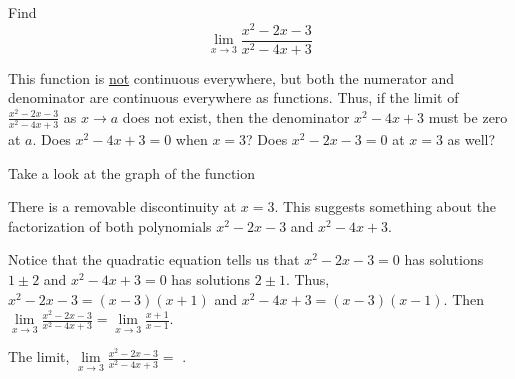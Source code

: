 \documentclass{ximera}
\begin{document}
\begin{question}
  Find 
  \[
  \displaystyle \lim_{x\to3} \frac{x^2-2x-3}{x^2-4x+3}
  \]
  \begin{solution}
    \begin{hint}
      This function is \underline{not} continuous everywhere, but both the numerator and denominator are continuous everywhere as functions. Thus, if the limit of $\frac{x^2-2x-3}{x^2-4x+3}$ as $x\to{a}$ does not exist, then the denominator $x^2-4x+3$ must be zero at $a$. Does $x^2-4x+3=0$ when $x=3$? Does $x^2-2x-3=0$ at $x=3$ as well?
    \end{hint}
     \begin{hint}
    Take a look at the graph of the function
    \begin{center}
      \end{center}
      There is a removable discontinuity at $x=3$. This suggests something about the factorization of both polynomials $x^2-2x-3$ and $x^2-4x+3$.
    \end{hint}
    \begin{hint}
     Notice that the quadratic equation tells us that $x^2-2x-3=0$ has solutions $1\pm2$ and $x^2-4x+3=0$ has solutions $2\pm{1}$. Thus, $x^2-2x-3=\left(x-3\right)\left(x+1\right)$ and $x^2-4x+3=\left(x-3\right)\left(x-1\right)$. Then $\lim\limits_{x\to3}\frac{x^2-2x-3}{x^2-4x+3}=\lim\limits_{x\to3}\frac{x+1}{x-1}$. 
    \end{hint}
    The limit, $\lim\limits_{x\to3}\frac{x^2-2x-3}{x^2-4x+3}=$
    .
  \end{solution}
\end{question}
\end{document}
